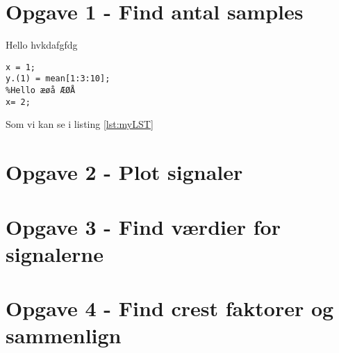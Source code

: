 \documentclass[../main.tex]{subfiles}
\begin{document}
\section{Opgave 1 - Find antal samples}

Hello hvkdafgfdg

\begin{lstlisting}[caption={My lstlisting}, label={lst:myLST}]
x = 1;
y.(1) = mean[1:3:10];
%Hello æøå ÆØÅ
x= 2;
\end{lstlisting}

Som vi kan se i listing \ref{lst:myLST}

\section{Opgave 2 - Plot signaler}



\section{Opgave 3 - Find værdier for signalerne}



\section{Opgave 4 - Find crest faktorer og sammenlign}
\end{document}
